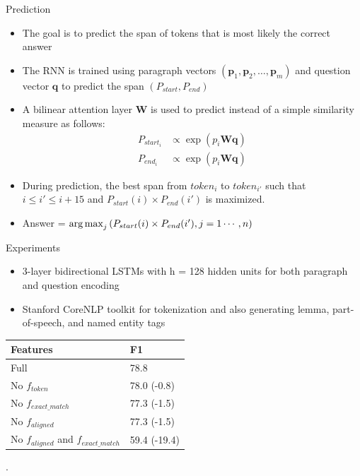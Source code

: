 \begin{frame}{Prediction}
\begin{itemize}
	\item The goal is to predict the span of tokens that is most likely the correct answer
	\item The RNN is trained using paragraph vectors $(\textbf{p}_1,\textbf{p}_2,\ldots,\textbf{p}_m)$ and question vector $\textbf{q}$ to predict the span $(P_{start}, P_{end})$
	\item A bilinear attention layer $\textbf{W}$ is used to predict instead of a simple similarity measure as follows:
\begin{align}
P_{start_i} &\propto \exp(p_i\mathbf{W}\mathbf{q})\\
P_{end_i} &\propto \exp(p_i\mathbf{W}\mathbf{q})
\end{align}
\item During prediction, the best span from $token_i$ to $token_{i'}$ such that $i\le i'\le i+ 15$ and $P_{start}(i)\times P_{end}(i')$ is maximized.

\item Answer = $ \operatorname*{\arg\max}_j \left({P_{start}(i)\times P_{end}(i')}, j = 1\cdots,n \right) $
\end{itemize}
\end{frame}

\begin{frame}{Experiments}
\begin{itemize}
	\item 3-layer bidirectional LSTMs with h = 128 hidden units for both paragraph and question encoding
	\item Stanford CoreNLP toolkit for tokenization and also generating lemma, part-of-speech, and named entity tags
\end{itemize}
\centering
\begin{tabular}{ll}
	Features&F1\\
	\hline
	Full & 78.8\\
	No $f_{token}$ &78.0 (-0.8)\\
	No $f_{exact\_match}$&77.3 (-1.5)\\
	No $f_{aligned}$&77.3 (-1.5)\\
	No $f_{aligned}$ and $f_{exact\_match}$&59.4 (-19.4)\\
	\hline
\end{tabular}
.
\end{frame}


